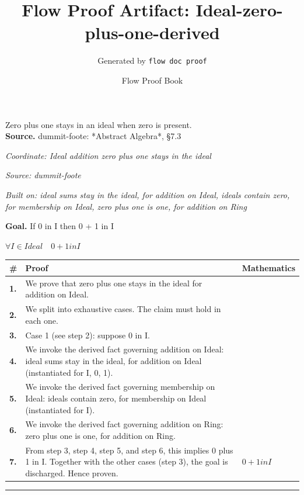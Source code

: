 \documentclass[11pt]{article}
\title{Flow Proof Artifact: Ideal-zero-plus-one-derived}
\author{Generated by \texttt{flow doc proof}}
\date{Flow Proof Book}
\theoremstyle{definition}
\begin{document}
\maketitle
Zero plus one stays in an ideal when zero is present.\\[0.5em]
\textbf{Source.} dummit-foote: *Abstract Algebra*, §7.3\\[0.5em]
\bigskip
{}\par
\smallskip\noindent\textit{Coordinate: Ideal \cdot addition \cdot zero plus one stays in the ideal}\par
\smallskip\noindent\textit{Source: dummit-foote}\par
\smallskip\noindent\textit{Built on: ideal sums stay in the ideal, for addition on Ideal, ideals contain zero, for membership on Ideal, zero plus one is one, for addition on Ring}\par
\medskip
\noindent\textbf{Goal.} If 0 in I then 0 + 1 in I\par
\noindent$\displaystyle \forall I \in Ideal\quad 0 + 1 in I$\par
\medskip
\noindent
\begin{tabular}{@{} >{\raggedright\arraybackslash}p{} >{\raggedright\arraybackslash}p{} >{\raggedleft\arraybackslash}p{} @{}}
\textbf{\#} & \textbf{Proof} & \textbf{Mathematics} \\
\midrule
\textbf{1.} & We prove that zero plus one stays in the ideal for addition on Ideal. & \\[0.45em]
\textbf{2.} & We split into exhaustive cases. The claim must hold in each one. & \\[0.45em]
\textbf{3.} & Case 1 (see step 2): suppose 0 in I. & \\[0.45em]
\textbf{4.} & We invoke the derived fact governing addition on Ideal: ideal sums stay in the ideal, for addition on Ideal (instantiated for I, 0, 1). & \\[0.45em]
\textbf{5.} & We invoke the derived fact governing membership on Ideal: ideals contain zero, for membership on Ideal (instantiated for I). & \\[0.45em]
\textbf{6.} & We invoke the derived fact governing addition on Ring: zero plus one is one, for addition on Ring. & \\[0.45em]
\textbf{7.} & From step 3, step 4, step 5, and step 6, this implies 0 plus 1 in I. Together with the other cases (step 3), the goal is discharged. Hence proven. & $\displaystyle 0 + 1 in I$ \\[0.45em]
\bottomrule
\end{tabular}
\label{thm:Ideal-addition-zero_plus_one_stays_in_the_ideal}
\par\medskip\hrule
\end{document}
